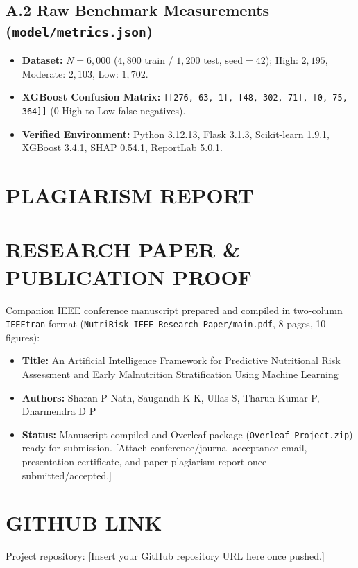 \documentclass[12pt,a4paper]{report}
\begin{document}
\section*{A.2 Raw Benchmark Measurements (\texttt{model/metrics.json})}
\begin{itemize}
    \item \textbf{Dataset:} $N = 6{,}000$ ($4{,}800$ train / $1{,}200$ test, $\text{seed} = 42$); High: $2{,}195$, Moderate: $2{,}103$, Low: $1{,}702$.
    \item \textbf{XGBoost Confusion Matrix:} \texttt{[[276, 63, 1], [48, 302, 71], [0, 75, 364]]} ($0$ High-to-Low false negatives).
    \item \textbf{Verified Environment:} Python 3.12.13, Flask 3.1.3, Scikit-learn 1.9.1, XGBoost 3.4.1, SHAP 0.54.1, ReportLab 5.0.1.
\end{itemize}

\chapter*{PLAGIARISM REPORT}

\chapter*{RESEARCH PAPER \& PUBLICATION PROOF}
\noindent Companion IEEE conference manuscript prepared and compiled in two-column \texttt{IEEEtran} format (\texttt{NutriRisk\_IEEE\_Research\_Paper/main.pdf}, 8 pages, 10 figures):
\begin{itemize}
    \item \textbf{Title:} An Artificial Intelligence Framework for Predictive Nutritional Risk Assessment and Early Malnutrition Stratification Using Machine Learning
    \item \textbf{Authors:} Sharan P Nath, Saugandh K K, Ullas S, Tharun Kumar P, Dharmendra D P
    \item \textbf{Status:} Manuscript compiled and Overleaf package (\texttt{Overleaf\_Project.zip}) ready for submission. [Attach conference/journal acceptance email, presentation certificate, and paper plagiarism report once submitted/accepted.]
\end{itemize}

\chapter*{GITHUB LINK}
\noindent Project repository: [Insert your GitHub repository URL here once pushed.]
\end{document}
